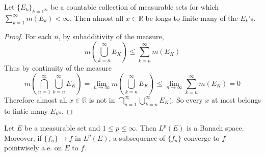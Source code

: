 \documentclass[lang=en, 12pt]{elegantbook}
\newcommand{\RR}{\mathbb{R}}
\begin{document}
        \begin{lemma}
            Let $\{E_k\}_{k=1^{\infty}}$ be a countable collection of measurable sets for 
        which $\sum_{k=1}^{\infty} m(E_k)<\infty$. Then almost all $x \in \RR$ be longs to finite 
        many of the $E_k$'s.
        \end{lemma}
        \begin{proof}
            For each $n$, by subadditivity of the measure,
            $$m(\bigcup_{k=n}^{\infty}E_K) \leq \sum_{k=n}^{\infty} m(E_K)$$
            Thus by continuity of the measure 
            $$m( \bigcap_{n=1}^{\infty}\bigcup_{k=n}^{\infty}E_K) = 
            \lim_{n \to \infty} m(\bigcup_{k=n}^{\infty}E_K) 
            \leq \lim_{n \to \infty} \sum_{k=n}^{\infty} m(E_K) 
            =0$$
            Therefore almost all $x \in \RR$ is not in 
            $\bigcap_{n=1}^{\infty}\bigcup_{k=n}^{\infty}E_K)$. So every $x$ at most belongs to fintie 
            many $E_k$s.
        \end{proof}
        \begin{theorem}
            Let $E$ be a measurable set and $1\leq p \leq \infty$. Then $L^p(E)$
        is a Banach space. Moreover, if $\{f_n\} \to f$ in $L^p(E)$, a subsequence 
        of $\{f_n\}$ converge to $f$ pointwisely a.e. on $E$ to $f$.
        \end{theorem}
\end{document}
